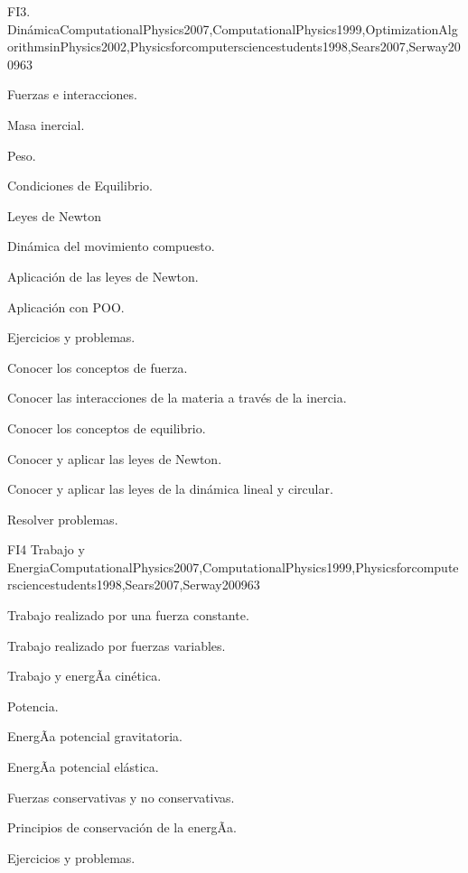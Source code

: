 \begin{syllabus}
\begin{unit}{FI3. Dinámica}{ComputationalPhysics2007,ComputationalPhysics1999,OptimizationAlgorithmsinPhysics2002,Physicsforcomputersciencestudents1998,Sears2007,Serway2009}{6}{3}
\begin{topics}
      \item Fuerzas e interacciones.
      \item Masa inercial.
      \item Peso.
      \item Condiciones de Equilibrio.
      \item Leyes de Newton
      \item Dinámica del movimiento compuesto.
      \item Aplicación de las leyes de Newton.
      \item Aplicación con POO.
      \item Ejercicios y problemas.
   \end{topics}

   \begin{learningoutcomes}
      \item Conocer los conceptos de fuerza.
      \item Conocer las interacciones de la materia a través de la inercia.
      \item Conocer los conceptos de equilibrio.
      \item Conocer y aplicar las leyes de Newton.      
      \item Conocer y aplicar las leyes de la dinámica lineal y circular.
      \item Resolver problemas.
   \end{learningoutcomes}
\end{unit}

\begin{unit}{FI4 Trabajo y Energia}{ComputationalPhysics2007,ComputationalPhysics1999,Physicsforcomputersciencestudents1998,Sears2007,Serway2009}{6}{3}
\begin{topics}
      \item Trabajo realizado por una fuerza constante.
      \item Trabajo realizado por fuerzas variables.
      \item Trabajo y energÃ­a cinética.
      \item Potencia.
      \item EnergÃ­a potencial gravitatoria.
      \item EnergÃ­a potencial elástica.
      \item Fuerzas conservativas y no conservativas.
      \item Principios de conservación de la energÃ­a.
      \item Ejercicios y problemas.
   \end{topics}


\end{unit}
\end{syllabus}
